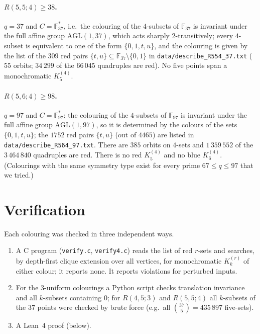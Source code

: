 \documentclass[11pt]{article}
\theoremstyle{definition}
\theoremstyle{remark}
\newcommand{\F}{\mathbb F}
\newcommand{\AGL}{\mathrm{AGL}}
\newcommand{\RFSF}{98}
\newcommand{\RFSFtext}{$q=97$ and $C=\F_{97}^{*}$: the colouring of the $4$-subsets of $\F_{97}$ is invariant
under the full affine group $\AGL(1,97)$, so it is determined by the colours of the sets $\{0,1,t,u\}$; the
$1752$ red pairs $\{t,u\}$ (out of $4465$) are listed in \texttt{data/describe\_R564\_97.txt}. There are $385$ orbits
on $4$-sets and $1\,359\,552$ of the $3\,464\,840$ quadruples are red. There is no red $K_5^{(4)}$ and no blue
$K_6^{(4)}$. (Colourings with the same symmetry type exist for every prime $67\le q\le 97$ that we tried.)}
\begin{document}
\paragraph{$R(5,5;4)\ge 38$.} $q=37$ and $C=\F_{37}^{*}$, i.e.\ the colouring of the $4$-subsets of
$\F_{37}$ is invariant under the full affine group $\AGL(1,37)$, which acts sharply $2$-transitively;
every $4$-subset is equivalent to one of the form $\{0,1,t,u\}$, and the colouring is given by the list of
the $309$ red pairs $\{t,u\}\subseteq\F_{37}\setminus\{0,1\}$ in \texttt{data/describe\_R554\_37.txt}
($55$ orbits; $34\,299$ of the $66\,045$ quadruples are red). No five points span a monochromatic
$K_5^{(4)}$.

\paragraph{$R(5,6;4)\ge\RFSF$.} \RFSFtext

\section{Verification}\label{sec:verify}

Each colouring was checked in three independent ways.

\begin{enumerate}
\item A C program (\texttt{verify.c}, \texttt{verify4.c}) reads the list of red $r$-sets and searches, by
  depth-first clique extension over all vertices, for monochromatic $K_k^{(r)}$ of either colour; it reports
  none. It reports violations for perturbed inputs.
\item For the $3$-uniform colourings a Python script checks translation invariance and all
  $k$-subsets containing $0$; for $R(4,5;3)$ and $R(5,5;4)$ all $k$-subsets of the $37$ points were checked
  by brute force (e.g.\ all $\binom{37}{5}=435\,897$ five-sets).
\item A Lean~4 proof (below).
\end{enumerate}
\end{document}

